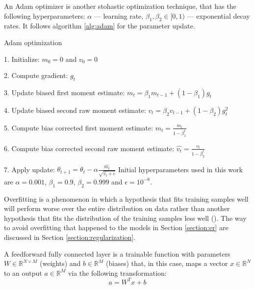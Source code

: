 \begin{definition}
	An Adam optimizer is another stohastic optimization technique, that has the following hyperparameters: $\alpha$ --- learning rate, $\beta_1, \beta_2 \in [0, 1)$ --- exponential decay rates. It follows algorithm \ref{alg:adam} for the parameter update.
	\begin{algorithm}[H]
		\caption{Adam optimization}\label{alg:adam}
		\item 1. Initialize: $m_0 = 0$ and $v_0 = 0$
		\item 2. Compute gradient: $g_t$
		\item 3. Update biased first moment estimate: $m_t = \beta_1 m_{t-1} + (1 - \beta_1) g_t$
		\item 4. Update biased second raw moment estimate: $v_t = \beta_2 v_{t-1} + (1 - \beta_2) g_t^2$
		\item 5. Compute bias corrected first moment estimate: $\hat{m_t} = \frac{m_t}{1 - \beta_1^t}$
		\item 6. Compute bias corrected second raw moment estimate: $\hat{v_t} = \frac{v_t}{1 - \beta_2^t}$
		\item 7. Apply update: $\theta_{t+1} = \theta_t - \alpha \frac{\hat{m_t}}{\sqrt{\hat{v_t} + \epsilon}}$
		Initial hyperparameters used in this work are $\alpha = 0.001$, $\beta_1 = 0.9$, $\beta_2 = 0.999$ and $\epsilon = 10^{-8}$.
	\end{algorithm}
\end{definition}

\begin{definition}[Overfitting]
	Overfitting is a phenomenon in which a hypothesis that fits training samples well will perform worse over the entire distribution on data rather than another hypothesis that fits the distribution of the training samples less well (\cite{mitchell_1997}). The way to avoid overfitting that happened to the models in Section \ref{section:er} are discussed in Section \ref{section:regularization}.
\end{definition}

\begin{definition}
	A feedforward fully connected layer is a trainable function with parameters $W \in \mathbb{R}^{N \times M}$ (weights) and $b \in \mathbb{R}^{M}$ (biases) that, in this case, maps a vector $x \in \mathbb{R}^{N}$ to an output $a \in \mathbb{R}^{M}$ via the following transformation:
		\begin{equation}
			a = W^{T}x + b
		\end{equation}
\end{definition}

